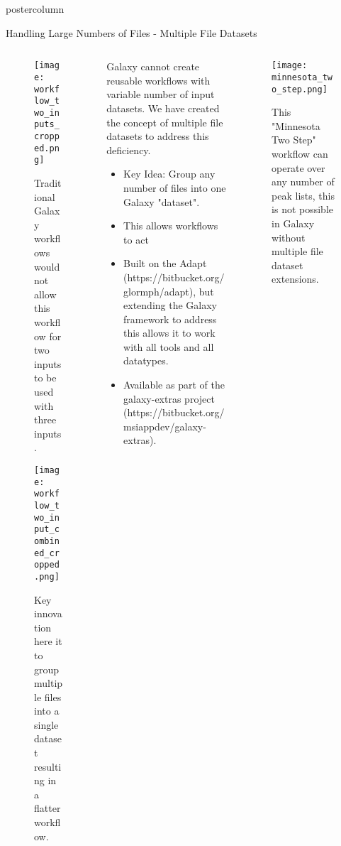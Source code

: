 \documentclass[final]{beamer}
\begin{document}
\begin{frame}
\begin{columns}
\begin{column}{.67\textwidth}
\begin{beamercolorbox}[center,wd=\textwidth]{postercolumn}
\begin{minipage}[T]{.98\textwidth}
{\begin{block}{Handling Large Numbers of Files - Multiple File Datasets}
\begin{columns}
                  \begin{column}{.30\textwidth}
                    \begin{figure}
                      \texttt{[image: workflow\_two\_inputs\_cropped.png]}
                      \caption{Traditional Galaxy workflows would not allow this workflow for two inputs to be used with three inputs.}
                    \end{figure}              
                    \vfill
                    \begin{figure}
                      \texttt{[image: workflow\_two\_input\_combined\_cropped.png]}
                      \caption{Key innovation here it to group multiple files into a single dataset resulting in a flatter workflow.}
                    \end{figure}
                  \end{column}

                  \begin{column}{.43\textwidth}
                    Galaxy cannot create reusable workflows with variable number of input datasets. We have created the concept of multiple file datasets to address this deficiency.
                    \begin{itemize}
                      \item Key Idea: Group any number of files into one Galaxy "dataset". 
                      \item This allows workflows to act
                      \item Built on the Adapt (https://bitbucket.org/glormph/adapt), but extending the Galaxy framework to address this allows it to work with all tools and all datatypes.
                      \item Available as part of the galaxy-extras project (https://bitbucket.org/msiappdev/galaxy-extras).
                    \end{itemize}
                  \end{column}

                  \begin{column}{.25\textwidth}
                    \begin{figure}
                      \texttt{[image: minnesota\_two\_step.png]}
                      \caption{This "Minnesota Two Step" workflow can operate over any number of peak lists, this is not possible in Galaxy without multiple file dataset extensions.}
                    \end{figure}              
                  \end{column}


\end{columns}
\end{block}}
\end{minipage}
\end{beamercolorbox}
\end{column}
\end{columns}
\end{frame}
\end{document}
